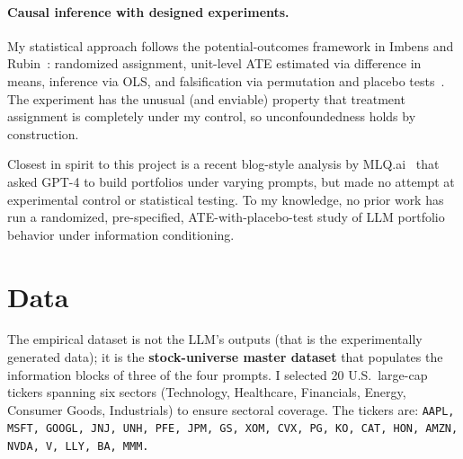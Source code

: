 \documentclass[11pt]{article}
\begin{document}
\paragraph{Causal inference with designed experiments.}
My statistical approach follows the potential-outcomes framework in
Imbens and Rubin~\cite{Imbens2015}: randomized assignment, unit-level ATE estimated via
difference in means, inference via OLS, and falsification via permutation
and placebo tests~\cite{Rosenbaum2002}. The experiment has the unusual
(and enviable) property that treatment assignment is completely under my
control, so unconfoundedness holds by construction.

Closest in spirit to this project is a recent blog-style analysis by
MLQ.ai~\cite{MLQ2024} that asked GPT-4 to build portfolios under varying prompts,
but made no attempt at experimental control or statistical testing. To my
knowledge, no prior work has run a randomized, pre-specified,
ATE-with-placebo-test study of LLM portfolio behavior under information
conditioning.

\section{Data}

The empirical dataset is not the LLM's outputs (that is the experimentally
generated data); it is the \textbf{stock-universe master dataset} that
populates the information blocks of three of the four prompts. I selected 20
U.S.\ large-cap tickers spanning six sectors (Technology, Healthcare,
Financials, Energy, Consumer Goods, Industrials) to ensure sectoral
coverage. The tickers are:
\texttt{AAPL, MSFT, GOOGL, JNJ, UNH, PFE, JPM, GS, XOM, CVX, PG, KO, CAT,
HON, AMZN, NVDA, V, LLY, BA, MMM.}
\end{document}
